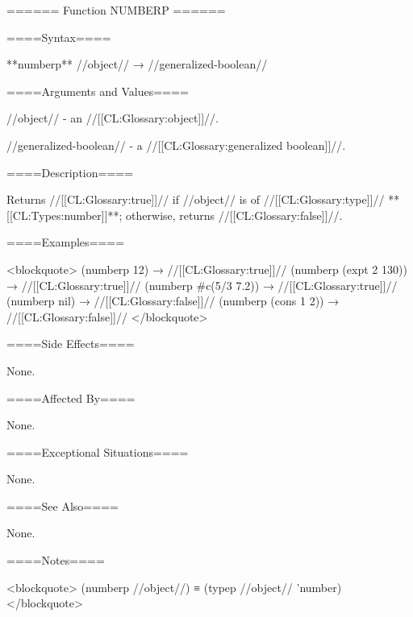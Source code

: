 ====== Function NUMBERP ======

====Syntax====

**numberp** //object// → //generalized-boolean//

====Arguments and Values====

//object// - an //[[CL:Glossary:object]]//.

//generalized-boolean// - a //[[CL:Glossary:generalized boolean]]//.

====Description====

Returns //[[CL:Glossary:true]]// if //object// is of //[[CL:Glossary:type]]// **[[CL:Types:number]]**; otherwise, returns //[[CL:Glossary:false]]//.

====Examples====

<blockquote> (numberp 12) → //[[CL:Glossary:true]]// (numberp (expt 2 130)) → //[[CL:Glossary:true]]// (numberp #c(5/3 7.2)) → //[[CL:Glossary:true]]// (numberp nil) → //[[CL:Glossary:false]]// (numberp (cons 1 2)) → //[[CL:Glossary:false]]// </blockquote>

====Side Effects====

None.

====Affected By====

None.

====Exceptional Situations====

None.

====See Also====

None.

====Notes====

<blockquote> (numberp //object//) ≡ (typep //object// 'number) </blockquote>

